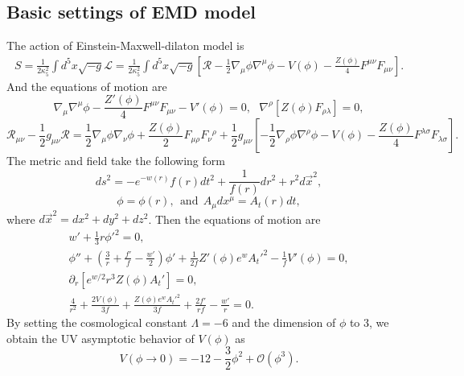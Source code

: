 \documentclass[a4paper,12pt]{article}
\numberwithin{equation}{section}
\begin{document}
\subsection{Basic settings of EMD model}
The action of Einstein-Maxwell-dilaton model is
\begin{eqnarray}
    S=\frac{1}{2\kappa_5^2}\int d^5x \sqrt{-g}\mathcal{L}=\frac{1}{2\kappa_5^2}\int d^5x \sqrt{-g}\left[\mathcal{R}-\frac{1}{2}\nabla_{\mu}\phi\nabla^{\mu}\phi-V(\phi)-\frac{Z(\phi)}{4}F^{\mu\nu}F_{\mu\nu}\right] .
\end{eqnarray}
And the equations of motion are
\begin{equation}
    \nabla_{\mu}\nabla^{\mu}\phi-\frac{Z'(\phi)}{4}F^{\mu\nu} F_{\mu\nu}-V'(\phi)=0,~~~
    \nabla^\rho \left[Z(\phi) F_{\rho\lambda}\right]=0, \nonumber
\end{equation}
\begin{equation}
    \mathcal{R}_{\mu\nu}-\frac{1}{2}g_{\mu\nu}\mathcal{R}=\frac{1}{2}\nabla_{\mu}\phi\nabla_{\nu}\phi+\frac{Z(\phi)}{2}F_{\mu\rho}F_{\nu}{}^{\rho}+\frac{1}{2} g_{\mu\nu} \left[-\frac{1}{2}\nabla_{\rho}\phi\nabla^{\rho}\phi-V(\phi)-\frac{Z(\phi)}{4}F^{\lambda\sigma}F_{\lambda\sigma}  \right].
\end{equation}
The metric and field take the following form
\begin{equation}
    ds^2=-e^{-w(r)}f(r)dt^2+\frac{1}{f(r)}dr^2+r^2d\vec{x}^2 , \nonumber
\end{equation}
\begin{equation}
    \phi=\phi(r), ~~\text{and}~~A_{\mu}dx^{\mu}=A_t(r)dt,
\end{equation}
where $d\vec{x}^2=dx^2+dy^2+dz^2$. Then the equations of motion are
\begin{eqnarray}
    w'+\frac{1}{3}r \phi'^2=0, \nonumber \\ 
    \phi''+\left( \frac{3}{r}+\frac{f'}{f}-\frac{w'}{2} \right)\phi'+\frac{1}{2f}Z'(\phi) e^{w}  A_t'^2-\frac{1}{f}V'(\phi)=0, \nonumber \\
    \partial_r \left[ e^{w/2}r^3 Z(\phi) A_t' \right]=0, \nonumber \\
    \frac{4}{r^2}+\frac{2V(\phi)}{3f}+\frac{Z(\phi)e^{w}A_t'^2}{3f}+\frac{2f'}{rf}-\frac{w'}{r}=0.
\end{eqnarray}
By setting the cosmological constant $\Lambda=-6$ and the dimension of $\phi$ to 3, we obtain the UV asymptotic behavior of $V(\phi)$ as
\begin{equation}
    V(\phi\rightarrow 0)=-12-\frac{3}{2}\phi^2+\mathcal{O}(\phi^3).
\end{equation}
\end{document}
